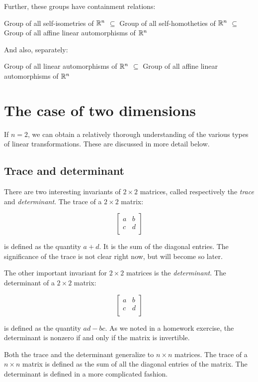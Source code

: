 \documentclass[10pt]{amsart}
\begin{document}
Further, these groups have containment relations:

Group of all self-isometries of $\mathbb{R}^n$ $\subseteq$ Group of all self-homotheties of $\mathbb{R}^n$ $\subseteq$ Group of all affine linear automorphisms of $\mathbb{R}^n$

And also, separately:

Group of all linear automorphisms of $\mathbb{R}^n$ $\subseteq$ Group of all affine linear automorphisms of $\mathbb{R}^n$

\section{The case of two dimensions}

If $n = 2$, we can obtain a relatively thorough understanding of the
various types of linear transformations. These are discussed in more
detail below.

\subsection{Trace and determinant}

There are two interesting invariants of $2 \times 2$ matrices, called
respectively the {\em trace} and {\em determinant}. The trace of a $2
\times 2$ matrix:

$$\left[\begin{matrix} a & b \\ c & d \\\end{matrix}\right]$$

is defined as the quantity $a + d$. It is the sum of the diagonal
entries. The significance of the trace is not clear right now, but
will become so later.

The other important invariant for $2 \times 2$ matrices is the {\em
  determinant}. The determinant of a $2 \times 2$ matrix:

$$\left[\begin{matrix} a & b \\ c & d \\\end{matrix}\right]$$

is defined as the quantity $ad - bc$. As we noted in a homework
exercise, the determinant is nonzero if and only if the matrix is
invertible.

Both the trace and the determinant generalize to $n \times n$
matrices. The trace of a $n \times n$ matrix is defined as the sum of
all the diagonal entries of the matrix. The determinant is defined in
a more complicated fashion.
\end{document}
